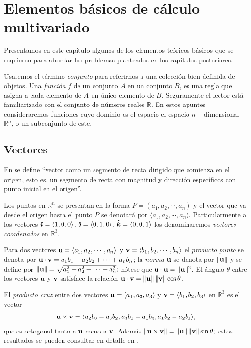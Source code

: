 \chapter{Elementos básicos de cálculo multivariado}

Presentamos en este capítulo algunos de los elementos teóricos básicos que se requieren para abordar
los problemas planteados en los capítulos posteriores.

Usaremos el término \emph{conjunto} para referirnos a una colección bien definida de objetos.
Una \emph{función} $f$ de un conjunto $A$
en un conjunto $B$, es una regla que asigna a cada elemento de $A$ un único elemento de $B$.
Seguramente el lector está familiarizado con el conjunto de números reales $\mathbb{R}$.
En estos apuntes consideraremos funciones cuyo dominio es el espacio el espacio $n-$dimensional $\mathbb{R}^n$,
o un subconjunto de este.

\section{Vectores}
En \cite[p.~5]{marsden_calculo_2013} se define ``vector como un segmento de recta dirigido que comienza en el origen,
esto es, un segmento de recta con magnitud y dirección específicos con punto inicial en el origen''.

Los puntos en $\mathbb{R}^n$ se presentan en la forma $P=(a_1,a_2,\cdots, a_n)$
y el vector que va desde el origen hasta el punto $P$ se denotará por $\langle a_1,a_2,\cdots, a_n\rangle$.
Particularmente a los vectores $\boldsymbol{\hat{\imath}}=\langle 1,0,0 \rangle$, $\boldsymbol{\hat{\jmath}}=\langle 0,1,0 \rangle$, $\boldsymbol{\hat{k}}=\langle 0,0,1 \rangle$ los denominaremos \emph{vectores coordenados} en $\mathbb{R}^3$.

Para dos vectores $\mathbf{u}=\langle a_1,a_2,\cdots, a_n\rangle$ y $\mathbf{v}=\langle b_1,b_2,\cdots, b_n\rangle$
el \emph{producto punto} se denota por $\mathbf{u}\cdot \mathbf{v} = a_1b_1+a_2b_2+\cdots+a_nb_n$;
la \emph{norma} $\mathbf{u}$ se denota por $\Vert \mathbf{u} \Vert$ y se define
por  $\Vert \mathbf{u}\Vert=\sqrt{a_1^2+a_2^2+\cdots+a_n^2};$ nótese que
$\mathbf{u}\cdot \mathbf{u}=\Vert \mathbf{u}\Vert^2$.
El ángulo $\theta $ entre los vectores $\mathbf{u}$ y $\mathbf{v}$ satisface la relación
$\mathbf{u} \cdot \mathbf{v}= \left\|\mathbf{u}\right\| \left\| \mathbf{v}\right\| \cos \theta $.

El \emph{producto cruz} entre dos vectores  $\mathbf{u}=\langle a_{1},a_{2},a_{3}\rangle$ y
$\mathbf{v}=\langle b_{1},b_{2},b_{3}\rangle$ en $\mathbb{R}^3$ es el vector
\begin{equation*}
  \mathbf{u}\times \mathbf{v}=\langle a_{2}b_{3}-a_{3}b_{2},a_{3}b_{1}-a_{1}b_{3},a_{1}b_{2}-a_{2}b_{1}\rangle,
\end{equation*}
que es ortogonal tanto a $\mathbf{u}$ como a $\mathbf{v}$.
Además $\left\Vert \mathbf{u}\times \mathbf{v}\right\Vert =\left\Vert \mathbf{u}\right\Vert\left\Vert \mathbf{v}\right\Vert\sin\theta;$ estos resultados se pueden consultar en detalle en \textcite{apostol_calculus_1999}.


